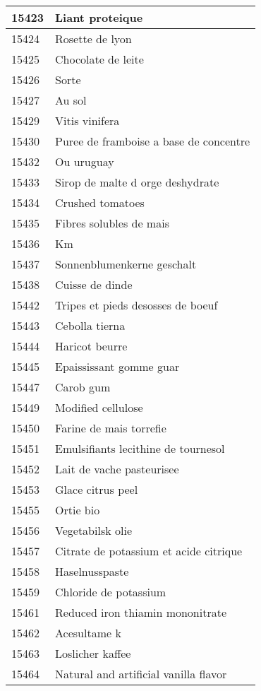 \begin{longtable}{|l|l|}
15423 & Liant proteique \\ \hline 
15424 & Rosette de lyon \\ \hline 
15425 & Chocolate de leite \\ \hline 
15426 & Sorte \\ \hline 
15427 & Au sol \\ \hline 
15429 & Vitis vinifera \\ \hline 
15430 & Puree de framboise a base de concentre \\ \hline 
15432 & Ou uruguay \\ \hline 
15433 & Sirop de malte d orge deshydrate \\ \hline 
15434 & Crushed tomatoes \\ \hline 
15435 & Fibres solubles de mais \\ \hline 
15436 & Km \\ \hline 
15437 & Sonnenblumenkerne geschalt \\ \hline 
15438 & Cuisse de dinde \\ \hline 
15442 & Tripes et pieds desosses de boeuf \\ \hline 
15443 & Cebolla tierna \\ \hline 
15444 & Haricot beurre \\ \hline 
15445 & Epaississant gomme guar \\ \hline 
15447 & Carob gum \\ \hline 
15449 & Modified cellulose \\ \hline 
15450 & Farine de mais torrefie \\ \hline 
15451 & Emulsifiants lecithine de tournesol \\ \hline 
15452 & Lait de vache pasteurisee \\ \hline 
15453 & Glace citrus peel \\ \hline 
15455 & Ortie bio \\ \hline 
15456 & Vegetabilsk olie \\ \hline 
15457 & Citrate de potassium et acide citrique \\ \hline 
15458 & Haselnusspaste \\ \hline 
15459 & Chloride de potassium \\ \hline 
15461 & Reduced iron thiamin mononitrate \\ \hline 
15462 & Acesultame k \\ \hline 
15463 & Loslicher kaffee \\ \hline 
15464 & Natural and artificial vanilla flavor \\ \hline 

\end{longtable}
